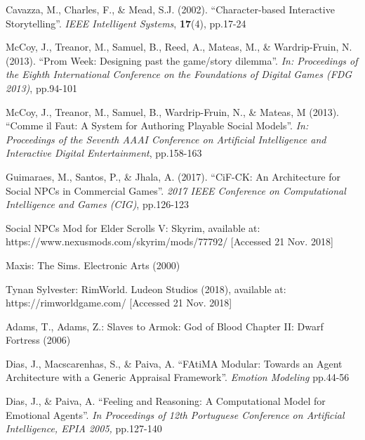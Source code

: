 \documentclass{sig-alternate-05-2015}
\begin{document}
\begin{thebibliography}{20}
Cavazza, M., Charles, F., \& Mead, S.J. (2002).
``Character-based Interactive Storytelling''.
\textit{IEEE Intelligent Systems}, \textbf{17}(4), pp.17-24

McCoy, J., Treanor, M., Samuel, B., Reed, A., Mateas, M., \& Wardrip-Fruin, N. (2013).
``Prom Week: Designing past the game/story dilemma''.
\textit{In: Proceedings of the Eighth International Conference on the Foundations of Digital Games (FDG 2013)}, pp.94-101

McCoy, J., Treanor, M., Samuel, B., Wardrip-Fruin, N., \& Mateas, M (2013).
``Comme il Faut: A System for Authoring Playable Social Models''.
\textit{In: Proceedings of the Seventh AAAI Conference on Artificial Intelligence and Interactive Digital Entertainment}, pp.158-163

Guimaraes, M., Santos, P., \& Jhala, A. (2017).
``CiF-CK: An Architecture for Social NPCs in Commercial Games''.
\textit{2017 IEEE Conference on Computational Intelligence and Games (CIG)}, pp.126-123

Social NPCs Mod for Elder Scrolls V: Skyrim, available at: https://www.nexusmods.com/skyrim/mods/77792/ [Accessed 21 Nov. 2018]

Maxis: The Sims. Electronic Arts (2000)

Tynan Sylvester: RimWorld. Ludeon Studios (2018), available at: https://rimworldgame.com/ [Accessed 21 Nov. 2018]

Adams, T., Adams, Z.: Slaves to Armok: God of Blood Chapter II: Dwarf Fortress (2006)

Dias, J., Macscarenhas, S., \& Paiva, A.
``FAtiMA Modular: Towards an Agent Architecture with
a Generic Appraisal Framework''.
\textit{Emotion Modeling} pp.44-56

Dias, J., \& Paiva, A.
``Feeling and Reasoning: A Computational Model for Emotional Agents''.
\textit{In Proceedings of 12th Portuguese Conference on Artificial Intelligence, EPIA 2005,} pp.127-140


\end{thebibliography}
 
\end{document}
